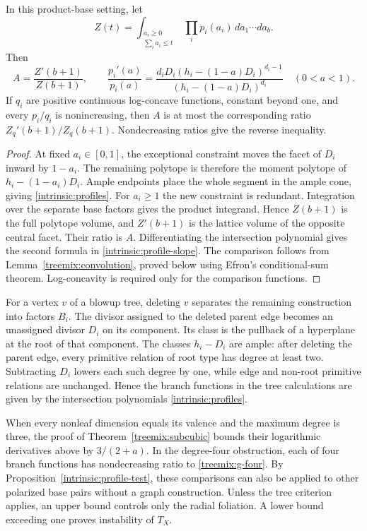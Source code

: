 \begin{proposition}\label{intrinsic:profile-test}
In this product-base setting, let
\[
 Z(t)=\int_{\substack{a_i\ge0\\\sum_i a_i\le t}}
                 \prod_i p_i(a_i)\,da_1\cdots da_b.
\]
Then
\begin{equation}\label{intrinsic:profile-slope}
 A=\frac{Z'(b+1)}{Z(b+1)},\qquad
 \frac{p_i'(a)}{p_i(a)}
 =\frac{d_iD_i(h_i-(1-a)D_i)^{d_i-1}}
        {(h_i-(1-a)D_i)^{d_i}}\quad(0<a<1).
\end{equation}
If $q_i$ are positive continuous log-concave functions, constant beyond
one, and every $p_i/q_i$ is nonincreasing, then $A$ is at most the
corresponding ratio $Z_q'(b+1)/Z_q(b+1)$. Nondecreasing ratios give
the reverse inequality.
\end{proposition}

\begin{proof}
At fixed $a_i\in[0,1]$, the exceptional constraint moves the facet of
$D_i$ inward by $1-a_i$. The remaining polytope is therefore the
moment polytope of $h_i-(1-a_i)D_i$. Ample endpoints place the whole segment in the ample cone, giving
\eqref{intrinsic:profiles}. For $a_i\ge1$ the new constraint is
redundant. Integration over the separate base factors gives the product integrand. Hence $Z(b+1)$ is the full polytope volume, and $Z'(b+1)$
is the lattice volume of the opposite central facet. Their ratio is
$A$. Differentiating the intersection polynomial gives the second
formula in \eqref{intrinsic:profile-slope}. The comparison follows from Lemma~\ref{treemix:convolution}, proved
below using Efron's conditional-sum theorem. Log-concavity is required
only for the comparison functions.
\end{proof}

For a vertex $v$ of a blowup tree, deleting $v$ separates the remaining
construction into factors $B_i$. The divisor assigned to the deleted parent edge becomes an unassigned
divisor $D_i$ on its component. Its class is the pullback of a
hyperplane at the root of that component.
The classes $h_i-D_i$ are ample: after deleting the parent edge,
every primitive relation of root type has degree at least two.
Subtracting $D_i$ lowers each such degree by one, while edge and
non-root primitive relations are unchanged.
Hence the branch functions in the tree calculations are given by the
intersection polynomials \eqref{intrinsic:profiles}.

When every nonleaf dimension equals its valence and the maximum degree
is three, the proof of Theorem~\ref{treemix:subcubic} bounds their
logarithmic derivatives above by $3/(2+a)$. In the degree-four
obstruction, each of four branch functions has nondecreasing ratio
to \eqref{treemix:g-four}. By Proposition~\ref{intrinsic:profile-test},
these comparisons can also be applied to other polarized base pairs
without a graph construction. Unless the tree criterion applies,
an upper bound controls only the radial foliation. A lower bound
exceeding one proves instability of $T_X$.

